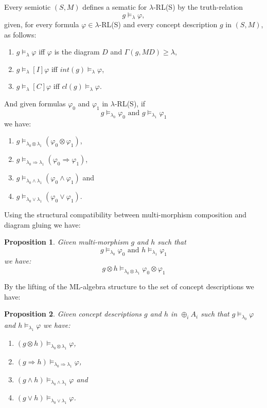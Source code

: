 \documentclass[oribibl]{llncs}
\newtheorem{prop}{Proposition}
\begin{document}
Every semiotic $(S,M)$ defines a sematic for $\lambda$-RL(S) by the
truth-relation \[g\models_\lambda \varphi,\] given, for every formula
$\varphi\in\lambda$-RL(S) and every concept description $g$ in
$(S,M)$, as follows:
\begin{enumerate}
  \item $g\models_\lambda \varphi$ iff $\varphi$ is the diagram $D$ and $\Gamma(g,MD)\geq\lambda$,
 \item $g\models_\lambda [I]\varphi$ iff $int(g)\models_\lambda \varphi$,
  \item $g\models_\lambda [C]\varphi$ iff $cl(g)\models_\lambda
  \varphi$.
\end{enumerate}
And given formulas
$\varphi_0$ and $\varphi_1$ in $\lambda$-RL(S), if
\[g\models_{\lambda_0} \varphi_0\text{ and }g\models_{\lambda_1} \varphi_1\]
we have:
\begin{enumerate}
  \item $g\models_{\lambda_0\otimes\lambda_1} (\varphi_0\otimes \varphi_1)$,
  \item $g\models_{\lambda_0\Rightarrow\lambda_1} (\varphi_0\Rightarrow \varphi_1)$,
  \item $g\models_{\lambda_0\wedge\lambda_1} (\varphi_0\wedge \varphi_1)$ and
  \item $g\models_{\lambda_0\vee\lambda_1} (\varphi_0\vee \varphi_1)$.
\end{enumerate}
Using the structural compatibility between multi-morphism composition
and diagram gluing we have:

\begin{prop}
Given multi-morphism $g$ and $h$ such that
\[g\models_{\lambda_0} \varphi_0\text{ and }h\models_{\lambda_1}
\varphi_1\] we have: \[g\otimes
h\models_{\lambda_0\otimes\lambda_1} \varphi_0 \otimes \varphi_1\]
\end{prop}

By the lifting of the ML-algebra structure to the set of concept
descriptions we have:
\begin{prop}
Given concept descriptions $g$ and $h$ in $\oplus_iA_i$ such that
$g\models_{\lambda_0} \varphi$ and $h\models_{\lambda_1} \varphi$ we
have:
\begin{enumerate}
  \item $(g\otimes h)\models_{\lambda_0\otimes\lambda_1} \varphi$,
  \item $(g\Rightarrow h)\models_{\lambda_0\Rightarrow\lambda_1} \varphi$,
  \item $(g\wedge h)\models_{\lambda_0\wedge\lambda_1} \varphi$
  and
  \item $(g\vee h)\models_{\lambda_0\vee\lambda_1} \varphi$.
\end{enumerate}
\end{prop}
\end{document}
